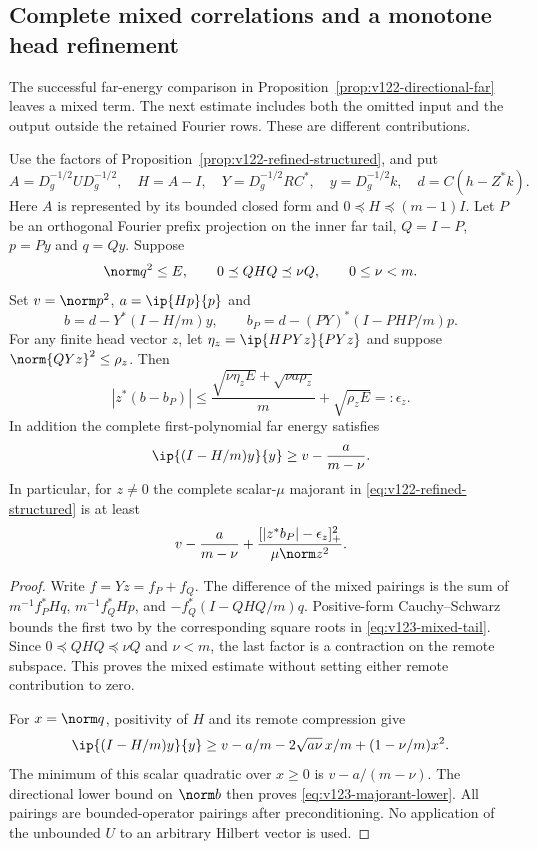 \subsection*{Complete mixed correlations and a monotone head refinement}

The successful far-energy comparison in
Proposition~\ref{prop:v122-directional-far} leaves a mixed term.
The next estimate includes both the omitted input and the output
outside the retained Fourier rows. These are different contributions.

\begin{proposition}
\label{prop:v123-mixed-tail}
Use the factors of Proposition~\ref{prop:v122-refined-structured},
and put
\[
 A=D_g^{-1/2}UD_g^{-1/2},\quad H=A-I,\quad
 Y=D_g^{-1/2}RC^*,\quad y=D_g^{-1/2}k,\quad d=C(h-Z^*k).
\]
Here $A$ is represented by its bounded closed form and
$0\preceq H\preceq(m-1)I$. Let $P$ be an orthogonal Fourier
prefix projection on the inner far tail, $Q=I-P$, $p=Py$ and
$q=Qy$. Suppose
\[
 \norm q^2\le E,\qquad 0\preceq QHQ\preceq\nu Q,
 \qquad 0\le\nu<m.
\]
Set $v=\norm p^2$, $a=\ip{Hp}{p}$ and
\[
 b=d-Y^*(I-H/m)y,\qquad
 b_P=d-(PY)^*(I-PHP/m)p.
\]
For any finite head vector $z$, let
$\eta_z=\ip{H PYz}{PYz}$ and suppose
$\norm{QYz}^2\le\rho_z$. Then
\begin{equation}\label{eq:v123-mixed-tail}
 |z^*(b-b_P)|\le
 \frac{\sqrt{\nu\eta_z E}+\sqrt{\nu a\rho_z}}{m}
       +\sqrt{\rho_z E}=:\epsilon_z.
\end{equation}
In addition the complete first-polynomial far energy satisfies
\begin{equation}\label{eq:v123-far-lower}
 \ip{(I-H/m)y}{y}\ge v-\frac{a}{m-\nu}.
\end{equation}
In particular, for $z\ne0$ the complete scalar-$\mu$ majorant
in \eqref{eq:v122-refined-structured} is at least
\begin{equation}\label{eq:v123-majorant-lower}
 v-\frac{a}{m-\nu}
 +\frac{[|z^*b_P|-\epsilon_z]_+^2}{\mu\norm z^2}.
\end{equation}
\end{proposition}
\begin{proof}
Write $f=Yz=f_P+f_Q$. The difference of the mixed pairings is
the sum of $m^{-1}f_P^*Hq$, $m^{-1}f_Q^*Hp$, and
$-f_Q^*(I-QHQ/m)q$. Positive-form Cauchy--Schwarz bounds the
first two by the corresponding square roots in
\eqref{eq:v123-mixed-tail}. Since $0\preceq QHQ\preceq\nu Q$
and $\nu<m$, the last factor is a contraction on the remote
subspace. This proves the mixed estimate without setting either
remote contribution to zero.

For $x=\norm q$, positivity of $H$ and its remote compression give
\[
 \ip{(I-H/m)y}{y}
 \ge v-a/m-2\sqrt{a\nu}\,x/m+(1-\nu/m)x^2.
\]
The minimum of this scalar quadratic over $x\ge0$ is
$v-a/(m-\nu)$. The directional lower bound on $\norm b$
then proves \eqref{eq:v123-majorant-lower}. All pairings are
bounded-operator pairings after preconditioning. No application
of the unbounded $U$ to an arbitrary Hilbert vector is used.
\end{proof}

